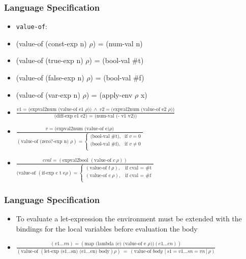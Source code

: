 \documentclass{beamer}
\begin{document}
\begin{frame}[fragile]
\frametitle{Language Specification}
\begin{scriptsize}
\begin{itemize}
\item<1-> \texttt{value-of}:

\item<2-> (value-of (const-exp n) $\rho$) = (num-val n)

\item<3-> (value-of (true-exp n) $\rho$) = (bool-val \#t)

\item<3-> (value-of (false-exp n) $\rho$) = (bool-val \#f)

\item<4-> (value-of (var-exp n) $\rho$) = (apply-env $\rho$ x)

\item<5->
$\frac{v1 = \text{(expval2num (value-of e1 } \rho)) \ \wedge \ v2 = \text{(expval2num (value-of e2 } \rho))}
      {\text{(diff-exp e1 e2) = (num-val (- v1 v2))}}$

\item<6->
$\frac
{v = \text{(expval2num (value-of e)} \rho)}
{(\text{value-of (zero?-exp n) } \rho)=
 \begin{cases}
    \text{(bool-val \#t)}, & \text{if } v = 0\\
    \text{(bool-val \#f)}, & \text{if } v \neq 0\\
  \end{cases}}$

\item<7->
$\frac
{cval = (\text{expval2bool } (\text{value-of } c \ \rho))}
{(\text{value-of } (\text{if-exp c t e} \rho) =
 \begin{cases}
   (\text{value-of } t \ \rho), & \text{if cval = \#t}\\
   (\text{value-of } e \ \rho), & \text{if cval = \#f}\\
 \end{cases}}$

\end{itemize}
\end{scriptsize}
\end{frame}

\begin{frame}[fragile]
\frametitle{Language Specification}
\begin{scriptsize}
\begin{itemize}
\item<1-> To evaluate a let-expression the environment must be extended with the bindings for the local variables before evaluation the body

\item<2->
$\frac{(v1\ldots vn) = (\text{map (lambda (e) (value-of e $\rho$))} (e1\dots en))}{(\text{value-of } (\text{let-exp (s1\ldots sn) (e1\ldots en) body}) \rho) \ = \ (\text{value-of } body \ [s1=v1\ldots sn=vn]\rho)}$

\end{itemize}
\end{scriptsize}
\end{frame}
\end{document}
